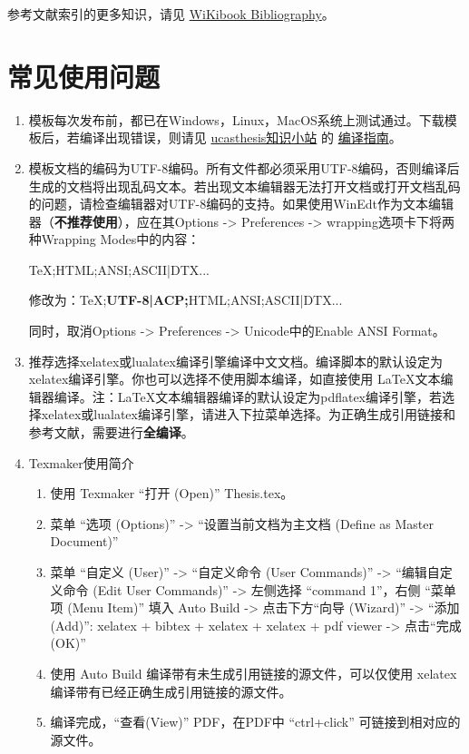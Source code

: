 参考文献索引的更多知识，请见 \href{https://en.wikibooks.org/wiki/LaTeX/Bibliography_Management}{WiKibook Bibliography}。\nocite{*}%

\section{常见使用问题}\label{sec:qa}

\begin{enumerate}
    \item 模板每次发布前，都已在Windows，Linux，MacOS系统上测试通过。下载模板后，若编译出现错误，则请见 \href{https://github.com/mohuangrui/ucasthesis/wiki}{ucasthesis知识小站} 的 \href{https://github.com/mohuangrui/ucasthesis/wiki/%E7%BC%96%E8%AF%91%E6%8C%87%E5%8D%97}{编译指南}。

    \item 模板文档的编码为UTF-8编码。所有文件都必须采用UTF-8编码，否则编译后生成的文档将出现乱码文本。若出现文本编辑器无法打开文档或打开文档乱码的问题，请检查编辑器对UTF-8编码的支持。如果使用WinEdt作为文本编辑器（\textbf{不推荐使用}），应在其Options -> Preferences -> wrapping选项卡下将两种Wrapping Modes中的内容：
        
        TeX;HTML;ANSI;ASCII|DTX...
        
        修改为：TeX;\textbf{UTF-8|ACP;}HTML;ANSI;ASCII|DTX...
        
        同时，取消Options -> Preferences -> Unicode中的Enable ANSI Format。

    \item 推荐选择xelatex或lualatex编译引擎编译中文文档。编译脚本的默认设定为xelatex编译引擎。你也可以选择不使用脚本编译，如直接使用 \LaTeX{}文本编辑器编译。注：\LaTeX{}文本编辑器编译的默认设定为pdflatex编译引擎，若选择xelatex或lualatex编译引擎，请进入下拉菜单选择。为正确生成引用链接和参考文献，需要进行\textbf{全编译}。

    \item Texmaker使用简介
        \begin{enumerate}
            \footnotesize
            \item 使用 Texmaker “打开 (Open)” Thesis.tex。
            \item 菜单 “选项 (Options)” -> “设置当前文档为主文档 (Define as Master Document)”
            \item 菜单 “自定义 (User)” -> “自定义命令 (User Commands)” -> “编辑自定义命令 (Edit User Commands)” -> 左侧选择 “command 1”，右侧 “菜单项 (Menu Item)” 填入 Auto Build -> 点击下方“向导 (Wizard)” -> “添加 (Add)”: xelatex + bibtex + xelatex + xelatex + pdf viewer -> 点击“完成 (OK)”
            \item 使用 Auto Build 编译带有未生成引用链接的源文件，可以仅使用 xelatex 编译带有已经正确生成引用链接的源文件。
            \item 编译完成，“查看(View)” PDF，在PDF中 “ctrl+click” 可链接到相对应的源文件。
        \end{enumerate}
    

\end{enumerate}
